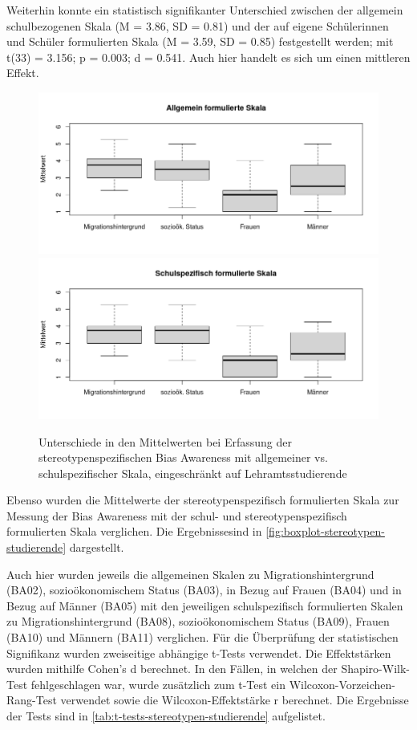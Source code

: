 Weiterhin konnte ein statistisch signifikanter Unterschied zwischen der allgemein schulbezogenen Skala (M = 3.86, SD = 0.81) und der auf eigene Schülerinnen und Schüler formulierten Skala (M = 3.59, SD = 0.85) festgestellt werden; mit t(33) = 3.156; p = 0.003; d = 0.541.
Auch hier handelt es sich um einen mittleren Effekt.

\begin{figure}[h!]
	\includegraphics[width=\textwidth]{resources/boxplot-stereotypen-1-studierende.png}
	\includegraphics[width=\textwidth]{resources/boxplot-stereotypen-2-studierende.png}
	\caption{Unterschiede in den Mittelwerten bei Erfassung der stereotypenspezifischen Bias Awareness mit allgemeiner vs. schulspezifischer Skala, eingeschränkt auf Lehramtsstudierende}
	\label{fig:boxplot-stereotypen-studierende}
\end{figure}

Ebenso wurden die Mittelwerte der stereotypenspezifisch formulierten Skala zur Messung der Bias Awareness mit der schul- und stereotypenspezifisch formulierten Skala verglichen.
Die Ergebnisse\break sind in \autoref{fig:boxplot-stereotypen-studierende} dargestellt.

Auch hier wurden jeweils die allgemeinen Skalen zu Migrationshintergrund (BA02), sozioökonomischem Status (BA03), in Bezug auf Frauen (BA04) und in Bezug auf Männer (BA05) mit den jeweiligen schulspezifisch formulierten Skalen zu Migrationshintergrund (BA08), sozioökonomischem Status (BA09), Frauen (BA10) und Männern (BA11) verglichen.
Für die Überprüfung der statistischen Signifikanz wurden zweiseitige abhängige t-Tests verwendet.
Die Effektstärken wurden mithilfe Cohen's d berechnet.
In den Fällen, in welchen der Shapiro-Wilk-Test fehlgeschlagen war, wurde zusätzlich zum t-Test ein Wilcoxon-Vorzeichen-Rang-Test verwendet sowie die Wilcoxon-Effektstärke r berechnet.
Die Ergebnisse der Tests sind in \autoref{tab:t-tests-stereotypen-studierende} aufgelistet.

